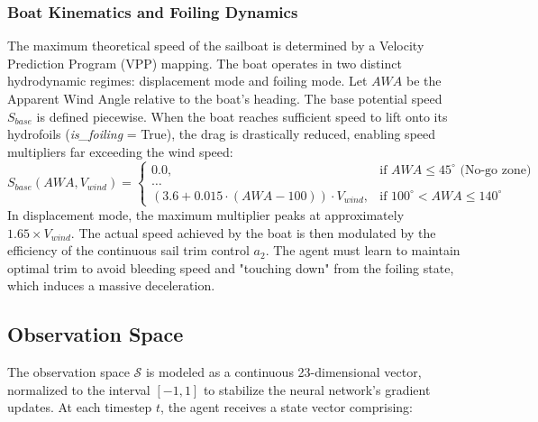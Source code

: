 \documentclass{article}
\begin{document}
\subsubsection{Boat Kinematics and Foiling Dynamics}
The maximum theoretical speed of the sailboat is determined by a Velocity Prediction Program (VPP) mapping. The boat operates in two distinct hydrodynamic regimes: displacement mode and foiling mode.
Let $AWA$ be the Apparent Wind Angle relative to the boat's heading. The base potential speed $S_{base}$ is defined piecewise. When the boat reaches sufficient speed to lift onto its hydrofoils (\textit{is\_foiling} = True), the drag is drastically reduced, enabling speed multipliers far exceeding the wind speed:
\begin{equation}
S_{base}(AWA, V_{wind}) = 
\begin{cases} 
0.0, & \text{if } AWA \le 45^\circ \text{ (No-go zone)} \\
\dots & \\
(3.6 + 0.015 \cdot (AWA - 100)) \cdot V_{wind}, & \text{if } 100^\circ < AWA \le 140^\circ 
\end{cases}
\end{equation}
In displacement mode, the maximum multiplier peaks at approximately $1.65 \times V_{wind}$. The actual speed achieved by the boat is then modulated by the efficiency of the continuous sail trim control $a_2$. The agent must learn to maintain optimal trim to avoid bleeding speed and "touching down" from the foiling state, which induces a massive deceleration.

\subsection{Observation Space}
The observation space $\mathcal{S}$ is modeled as a continuous 23-dimensional vector, normalized to the interval $[-1, 1]$ to stabilize the neural network's gradient updates. At each timestep $t$, the agent receives a state vector comprising:
\end{document}
